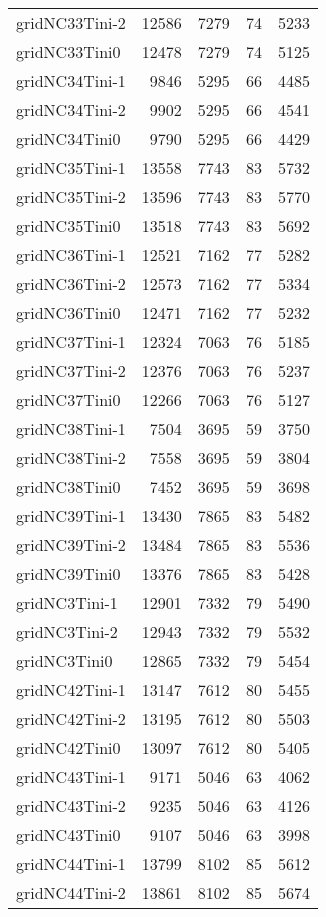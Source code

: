 \documentclass[../../../thesis.tex]{subfiles}
\begin{document}
\begin{longtable}{lrrrr}
gridNC33Tini-2 & 12586 & 7279 & 74 & 5233 \\
gridNC33Tini0 & 12478 & 7279 & 74 & 5125 \\
gridNC34Tini-1 & 9846 & 5295 & 66 & 4485 \\
gridNC34Tini-2 & 9902 & 5295 & 66 & 4541 \\
gridNC34Tini0 & 9790 & 5295 & 66 & 4429 \\
gridNC35Tini-1 & 13558 & 7743 & 83 & 5732 \\
gridNC35Tini-2 & 13596 & 7743 & 83 & 5770 \\
gridNC35Tini0 & 13518 & 7743 & 83 & 5692 \\
gridNC36Tini-1 & 12521 & 7162 & 77 & 5282 \\
gridNC36Tini-2 & 12573 & 7162 & 77 & 5334 \\
gridNC36Tini0 & 12471 & 7162 & 77 & 5232 \\
gridNC37Tini-1 & 12324 & 7063 & 76 & 5185 \\
gridNC37Tini-2 & 12376 & 7063 & 76 & 5237 \\
gridNC37Tini0 & 12266 & 7063 & 76 & 5127 \\
gridNC38Tini-1 & 7504 & 3695 & 59 & 3750 \\
gridNC38Tini-2 & 7558 & 3695 & 59 & 3804 \\
gridNC38Tini0 & 7452 & 3695 & 59 & 3698 \\
gridNC39Tini-1 & 13430 & 7865 & 83 & 5482 \\
gridNC39Tini-2 & 13484 & 7865 & 83 & 5536 \\
gridNC39Tini0 & 13376 & 7865 & 83 & 5428 \\
gridNC3Tini-1 & 12901 & 7332 & 79 & 5490 \\
gridNC3Tini-2 & 12943 & 7332 & 79 & 5532 \\
gridNC3Tini0 & 12865 & 7332 & 79 & 5454 \\
gridNC42Tini-1 & 13147 & 7612 & 80 & 5455 \\
gridNC42Tini-2 & 13195 & 7612 & 80 & 5503 \\
gridNC42Tini0 & 13097 & 7612 & 80 & 5405 \\
gridNC43Tini-1 & 9171 & 5046 & 63 & 4062 \\
gridNC43Tini-2 & 9235 & 5046 & 63 & 4126 \\
gridNC43Tini0 & 9107 & 5046 & 63 & 3998 \\
gridNC44Tini-1 & 13799 & 8102 & 85 & 5612 \\
gridNC44Tini-2 & 13861 & 8102 & 85 & 5674 \\

\end{longtable}
\end{document}
